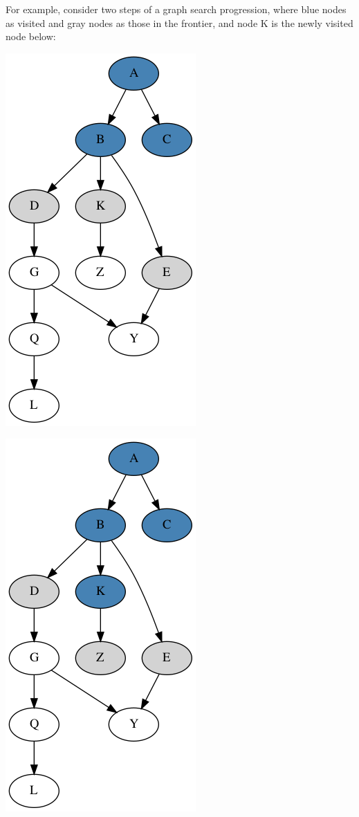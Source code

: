 \documentclass[10pt,a4paper]{article}
\begin{document}
For example, consider two steps of a graph search progression, where blue nodes as visited and gray nodes as those in the frontier, and node K is the newly visited node below:
\begin{center}
    \includegraphics[scale=0.25]{diagrams/g3.png}
\end{center}
\begin{center}
    \includegraphics[scale=0.25]{diagrams/g4.png}
\end{center}
\end{document}
